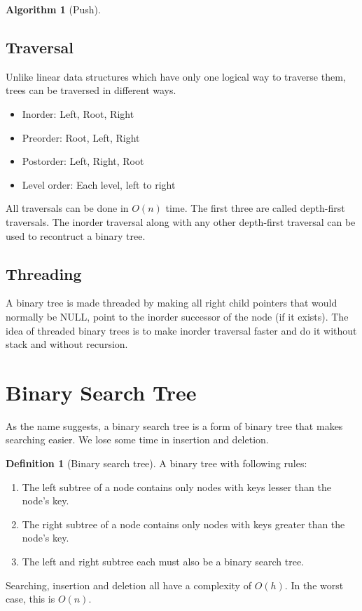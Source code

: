 \documentclass[10pt, a4paper]{extarticle}
\theoremstyle{definition}
\newtheorem{alg}{Algorithm}
\newtheorem{defn}{Definition}
\begin{document}
\begin{alg}[Push]
	\subsection{Traversal}
	Unlike linear data structures which have only one logical way to traverse them, trees can be traversed in different ways.
	\begin{itemize}
		\item Inorder: Left, Root, Right
		\item Preorder: Root, Left, Right
		\item Postorder: Left, Right, Root
		\item Level order: Each level, left to right
	\end{itemize}
	All traversals can be done in $O(n)$ time. The first three are called depth-first traversals. The inorder traversal along with any other depth-first traversal can be used to recontruct a binary tree.
	\subsection{Threading}
	A binary tree is made threaded by making all right child pointers that would normally be NULL, point to the inorder successor of the node (if it exists). The idea of threaded binary trees is to make inorder traversal faster and do it without stack and without recursion.

	\section{Binary Search Tree}
	As the name suggests, a binary search tree is a form of binary tree that makes searching easier. We lose some time in insertion and deletion.

	\begin{defn}[Binary search tree]
		A binary tree with following rules:
		\begin{enumerate}
			\item The left subtree of a node contains only nodes with keys lesser than the node’s key.
			\item The right subtree of a node contains only nodes with keys greater than the node’s key.
			\item The left and right subtree each must also be a binary search tree. 
	\end{enumerate}
	\end{defn}
	Searching, insertion and deletion all have a complexity of $O(h)$. In the worst case, this is $O(n)$.

\end{alg}
\end{document}
